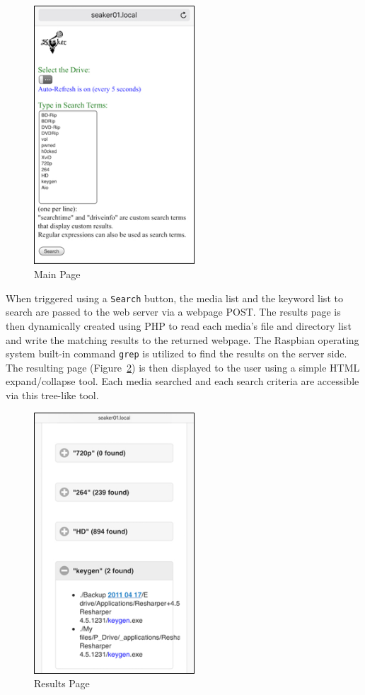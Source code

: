 \documentclass[12pt]{article}
\begin{document}
\begin{figure}[H]
  \begin{center}
  \includegraphics[width=6cm]{images/seaker-hh-screen-2.png}
  \caption{Main Page}
  \label{fig:MainPage}
  \end{center}
\end{figure}

When triggered using a \verb|Search| button, the media list and the
keyword list to search are passed to the web server via a webpage POST.  The
results page is then dynamically created using PHP to read each media's file
and directory list and write the matching results to the returned webpage.
The Raspbian operating system built-in command \verb|grep| is utilized to
find the results on the server side.\\

The resulting page (Figure~\ref{fig:ResultsPage}) is then displayed to the user 
using a simple HTML expand/collapse tool.  Each media searched and each search
criteria are accessible via this tree-like tool.\\

\begin{figure}[H]
  \begin{center}
  \includegraphics[width=6cm]{images/seaker-hh-screen-3.png}
  \caption{Results Page}
  \label{fig:ResultsPage}
  \end{center}
\end{figure}
\end{document}
